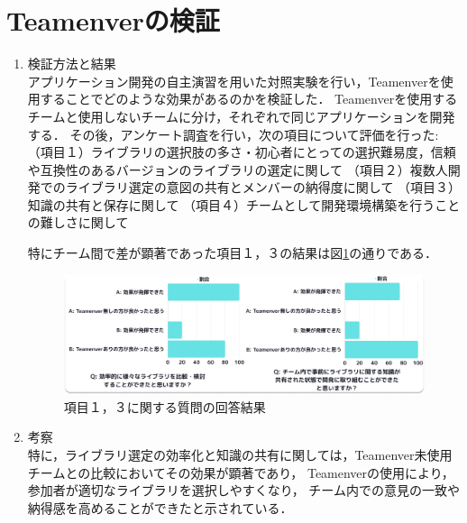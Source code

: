 \documentclass[main]{subfiles}
\begin{document}
\section{Teamenverの検証}
\begin{enumerate}
    \item 検証方法と結果\\
        アプリケーション開発の自主演習を用いた対照実験を行い，Teamenverを使用することでどのような効果があるのかを検証した．
        Teamenverを使用するチームと使用しないチームに分け，それぞれで同じアプリケーションを開発する．
        その後，アンケート調査を行い，次の項目について評価を行った: 
        （項目１）ライブラリの選択肢の多さ・初心者にとっての選択難易度，信頼や互換性のあるバージョンのライブラリの選定に関して
        （項目２）複数人開発でのライブラリ選定の意図の共有とメンバーの納得度に関して
        （項目３）知識の共有と保存に関して
        （項目４）チームとして開発環境構築を行うことの難しさに関して
        
        特にチーム間で差が顕著であった項目１，３の結果は図\ref{fig:result}の通りである．

        \begin{figure}[h]
            \centering
            \includegraphics[keepaspectratio,width=1\linewidth]{../figures/result.pdf}
            \caption{項目１，３に関する質問の回答結果}
            \label{fig:result}
        \end{figure}

    \item 考察\\
            特に，ライブラリ選定の効率化と知識の共有に関しては，Teamenver未使用チームとの比較においてその効果が顕著であり，
        Teamenverの使用により，参加者が適切なライブラリを選択しやすくなり，
        チーム内での意見の一致や納得感を高めることができたと示されている．
\end{enumerate}
\end{document}
